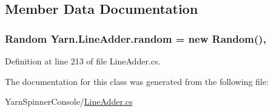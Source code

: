 \subsection{Member Data Documentation}
\hypertarget{a00132_ad887744b1b813fc081be814958742c37}{
\subsubsection[{random}]{\setlength{\rightskip}{0pt plus 5cm}Random Yarn.\-Line\-Adder.\-random = new Random()\hspace{0.3cm}{\ttfamily [static]}, {\ttfamily [private]}}}\label{a00132_ad887744b1b813fc081be814958742c37}


Definition at line 213 of file Line\-Adder.\-cs.



The documentation for this class was generated from the following file\-:\begin{DoxyCompactItemize}
\item 
Yarn\-Spinner\-Console/\hyperlink{a00327}{Line\-Adder.\-cs}\end{DoxyCompactItemize}
